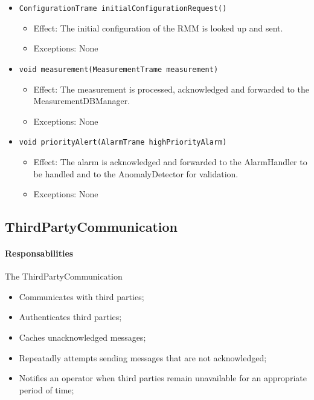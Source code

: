 \documentclass[a4paper,10pt]{article}
\begin{document}
\begin{itemize}
\begin{itemize}
        \item \texttt{ConfigurationTrame initialConfigurationRequest()}
        \begin{itemize}
            \item Effect: The initial configuration of the RMM is looked up and sent.
            \item Exceptions: None
        \end{itemize}
        \item \texttt{void measurement(MeasurementTrame measurement)}
        \begin{itemize}
            \item Effect: The measurement is processed, acknowledged and forwarded to the MeasurementDBManager.
            \item Exceptions: None
        \end{itemize}
        \item \texttt{void priorityAlert(AlarmTrame highPriorityAlarm)}
        \begin{itemize}
            \item Effect: The alarm is acknowledged and forwarded to the AlarmHandler to be handled and to the AnomalyDetector for validation.
            \item Exceptions: None
		\end{itemize}
    \end{itemize}
\end{itemize}


\subsection{ThirdPartyCommunication}
\paragraph{Responsabilities} 
The ThirdPartyCommunication
\begin{itemize}
	\item Communicates with third parties;
    \item Authenticates third parties;
    \item Caches unacknowledged messages;
    \item Repeatadly attempts sending messages that are not acknowledged;
    \item Notifies an operator when third parties remain unavailable for an appropriate period of time;
\end{itemize}
\end{document}
